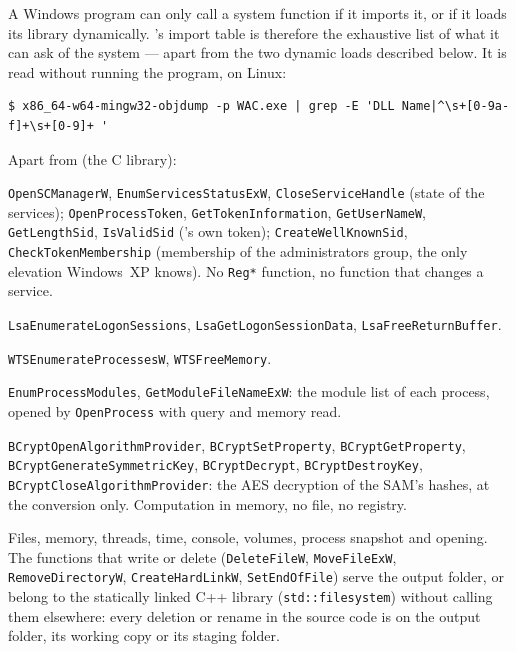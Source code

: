 \documentclass[11pt,a4paper,oneside]{report}
\begin{document}
A Windows program can only call a system function if it imports it, or if it
loads its library dynamically. 's import table is therefore
the exhaustive list of what it can ask of the system — apart from the two
dynamic loads described below. It is read without running the program, on
Linux:

\begin{lstlisting}
$ x86_64-w64-mingw32-objdump -p WAC.exe | grep -E 'DLL Name|^\s+[0-9a-f]+\s+[0-9]+ '
\end{lstlisting}

Apart from  (the C library):

\begin{description}[style=nextline,leftmargin=1.2em]
  \item[ADVAPI32.dll] \texttt{OpenSCManagerW}, \texttt{EnumServicesStatusExW},
    \texttt{CloseServiceHandle} (state of the services);
    \texttt{OpenProcessToken}, \texttt{GetTokenInformation},
    \texttt{GetUserNameW}, \texttt{GetLengthSid}, \texttt{IsValidSid}
    (\wac{}'s own token); \texttt{CreateWellKnownSid},
    \texttt{CheckTokenMembership} (membership of the
    administrators group, the only elevation Windows~XP knows). No \texttt{Reg*} function, no function that changes
    a service.
  \item[Secur32.dll] \texttt{LsaEnumerateLogonSessions},
    \texttt{LsaGetLogonSessionData}, \texttt{LsaFreeReturnBuffer}.
  \item[WTSAPI32.dll] \texttt{WTSEnumerateProcessesW},
    \texttt{WTSFreeMemory}.
  \item[PSAPI.DLL] \texttt{EnumProcessModules},
    \texttt{GetModuleFileNameExW}: the module list of each process, opened by
    \texttt{OpenProcess} with query and memory read.
  \item[bcrypt.dll] \texttt{BCryptOpenAlgorithmProvider},
    \texttt{BCryptSetProperty}, \texttt{BCryptGetProperty}, \texttt{BCryptGenerateSymmetricKey},
    \texttt{BCryptDecrypt}, \texttt{BCryptDestroyKey},
    \texttt{BCryptCloseAlgorithmProvider}: the AES decryption of the SAM's
    hashes, at the conversion only. Computation in memory, no file, no
    registry.
  \item[KERNEL32.dll] Files, memory, threads, time, console, volumes, process
    snapshot and opening. The functions that write or delete (\texttt{DeleteFileW},
    \texttt{MoveFileExW}, \texttt{RemoveDirectoryW}, \texttt{CreateHardLinkW},
    \texttt{SetEndOfFile}) serve the output folder, or belong to the
    statically linked C++ library (\texttt{std::filesystem}) without \wac{}
    calling them elsewhere: every deletion or rename in the source code is on
    the output folder, its working copy or its staging folder.
\end{description}
\end{document}
